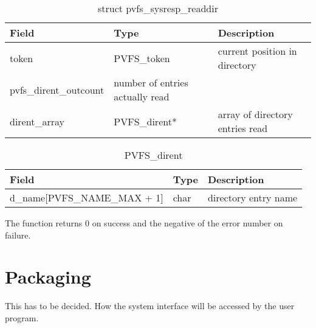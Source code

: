 \documentclass[11pt, letterpaper]{article}
\begin{document}
\begin{table}[H]
\begin{tabular}{|l|l|l|}
\hline
Field & Type & Description \\
\hline
\hline
token &  PVFS\_token &  current position in directory \\
\hline
pvfs\_dirent\_outcount & number of entries actually read \\
\hline
dirent\_array & PVFS\_dirent* & array of directory entries read \\
\hline
\end{tabular}
\caption{struct pvfs\_sysresp\_readdir}\label{tab:respreaddir}
\end{table}

\begin{table}[H]
\begin{tabular}{|l|l|l|}
\hline
Field & Type & Description \\
\hline
\hline
d\_name[PVFS\_NAME\_MAX + 1] & char & directory entry name \\
\hline
\end{tabular}
\caption{PVFS\_dirent}\label{tab:dirent}
\end{table}

The function returns 0 on success and the negative of the error
number on failure.

\section{Packaging}

This has to be decided.  How the system interface will be accessed by
the user program.
\end{document}

